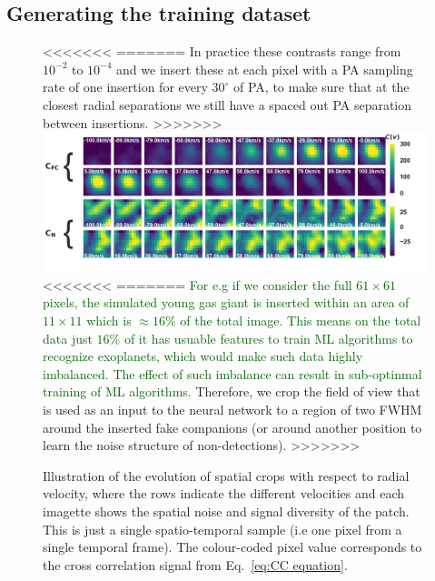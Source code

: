 \documentclass{aa}
\newcommand{\newchange}[1]{\textcolor{darkgreen}{#1}}
\begin{document}
{{{\subsection{Generating the training dataset}

\begin{figure}[t]
<<<<<<<
=======
In practice these contrasts range from $10^{-2}$ to $10^{-4}$ and we insert these at each pixel with a PA sampling rate of one insertion for every $30^{\circ}$ of PA, to make sure that at the closest radial separations we still have a spaced out PA separation between insertions. 
>>>>>>>
    \includegraphics[width=\textwidth]{fig_2_dec2023_aligned_cropped.png}
<<<<<<<
=======
\newchange{For e.g if we consider the full $61\times61$ pixels, the simulated \newchange{young gas giant} is inserted within an area of $11\times11$ which is $\approx 16\%$ of the total image.
This means on the total data just $16\%$ of it has usuable features to train ML algorithms to recognize exoplanets, which would make such data highly imbalanced.
The effect of such imbalance can result in sub-optinmal training of ML algorithms.}
Therefore, we crop the field of view that is used as an input to the neural network to a region of two FWHM around the inserted fake companions (or around another position to learn the noise structure of non-detections).
>>>>>>>
    \caption{%
    Illustration of the evolution of spatial crops with respect to radial velocity, where the rows indicate the different velocities and each imagette shows the spatial noise and signal diversity of the patch. 
    This is just a single spatio-temporal sample (i.e one pixel from a single temporal frame).
    The colour-coded pixel value corresponds to the cross correlation signal from Eq.~\ref{eq:CC equation}. 
    }
    \label{fig:fig-2}
\end{figure}

}}}
\end{document}

